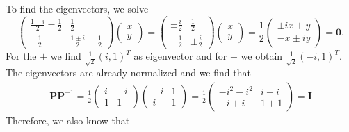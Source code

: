 \documentclass[10pt,a4paper]{article}
\newcommand{\half}[0]{\frac{1}{2}}
\newcommand{\bvec}[1]{\mathbf{#1}}
\begin{document}
To find the eigenvectors, we solve
\begin{equation*}
  \begin{pmatrix}
    \frac{1 \pm i}{2} - \half & \half \\
    -\half & \frac{1 \pm i}{2} - \half
  \end{pmatrix}
  \begin{pmatrix}
    x \\ y
  \end{pmatrix} =
  \begin{pmatrix}
    \pm \frac{i}{2} & \half \\
    -\half & \pm \frac{i}{2}
  \end{pmatrix}
  \begin{pmatrix}
    x \\ y
  \end{pmatrix} =
  \half
  \begin{pmatrix}
    \pm i x + y \\
    -x \pm i y
  \end{pmatrix}
  = \bvec{0}.
\end{equation*}
For the $+$ we find $\frac{1}{\sqrt{2}}(i, 1)^T$ as eigenvector and for $-$ we obtain $\frac{1}{\sqrt{2}}(-i, 1)^T.$ The eigenvectors are already normalized and we find that
\begin{align*}
  \bvec{P}\bvec{P}^{-1} =
  \half \begin{pmatrix}
    i & -i \\
    1 & 1
  \end{pmatrix}
  \begin{pmatrix}
   -i & 1 \\
    i & 1
  \end{pmatrix} = \half
  \begin{pmatrix}
    -i^2 - i^2 & i - i \\
     -i + i  & 1 + 1
  \end{pmatrix} = \bvec{I}
\end{align*}
Therefore, we also know that
\end{document}
